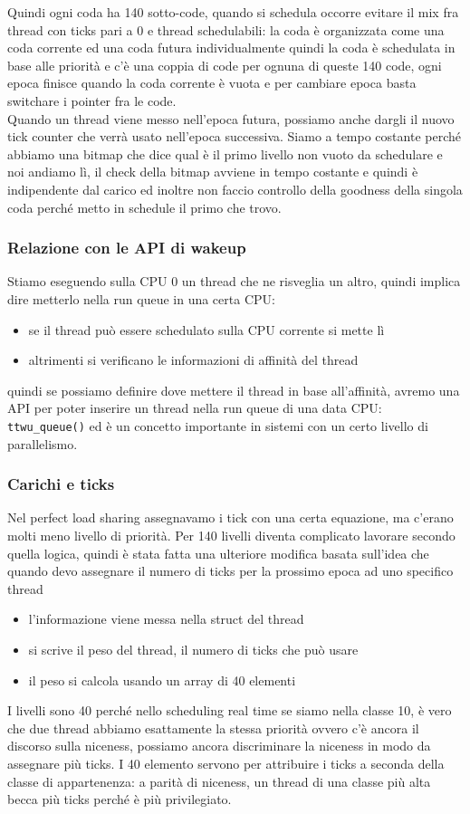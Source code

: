 \documentclass[12pt, oneside]{extbook}
\begin{document}
Quindi ogni coda ha 140 sotto-code, quando si schedula occorre evitare il mix fra thread con ticks pari a 0 e thread schedulabili: la coda è organizzata come una coda corrente ed una coda futura
individualmente quindi la coda è schedulata in base alle priorità e c'è una coppia di code per ognuna di queste 140 code, ogni epoca finisce quando la coda corrente è vuota e per cambiare epoca basta switchare i pointer fra le code.\\Quando un thread viene messo nell'epoca futura, possiamo anche dargli il nuovo tick counter che verrà usato nell'epoca successiva. Siamo a tempo costante perché abbiamo una bitmap che dice qual è il primo livello non vuoto da schedulare e noi andiamo lì, il check della bitmap avviene in tempo costante e quindi è indipendente dal carico ed inoltre non faccio controllo della goodness della singola coda perché metto in schedule il primo che trovo.
\subsubsection{Relazione con le API di wakeup}
Stiamo eseguendo sulla CPU 0 un thread che ne risveglia un altro, quindi implica dire metterlo nella run queue in una certa CPU:
\begin{itemize}
\item se il thread può essere schedulato sulla CPU corrente si mette lì
\item altrimenti si verificano le informazioni di affinità del thread
\end{itemize}
quindi se possiamo definire dove mettere il thread in base all'affinità, avremo una API per poter inserire un thread nella run queue di una data CPU: \texttt{ttwu\_queue()} ed è un concetto importante in sistemi con un certo livello di parallelismo.
\subsubsection{Carichi e ticks}
Nel perfect load sharing assegnavamo i tick con una certa equazione, ma c'erano molti meno livello di priorità. Per 140 livelli diventa complicato lavorare secondo quella logica, quindi è stata fatta una ulteriore modifica basata sull'idea che quando devo assegnare il numero di ticks per la prossimo epoca ad uno specifico thread
\begin{itemize}
\item l'informazione viene messa nella struct del thread
\item si scrive il peso del thread, il numero di ticks che può usare
\item il peso si calcola usando un array di 40 elementi
\end{itemize}
I livelli sono 40 perché nello scheduling real time se siamo nella classe 10, è vero che due thread abbiamo esattamente la stessa priorità ovvero c'è ancora il discorso sulla niceness, possiamo ancora discriminare la niceness in modo da assegnare più ticks. I 40 elemento servono per attribuire i ticks a seconda della classe di appartenenza: a parità di niceness, un thread di una classe più alta becca più ticks perché è più privilegiato.
\end{document}
